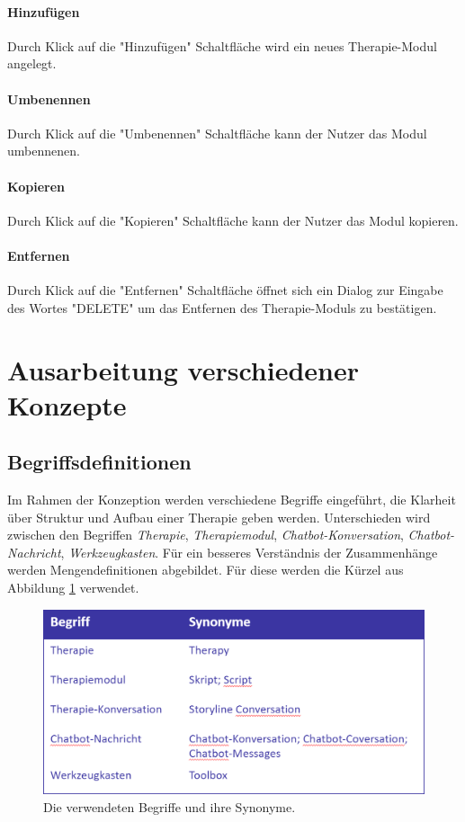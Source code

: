 \paragraph{Hinzufügen}Durch Klick auf die "Hinzufügen" Schaltfläche wird ein neues Therapie-Modul angelegt.

\paragraph{Umbenennen} Durch Klick auf die "Umbenennen" Schaltfläche kann der Nutzer das Modul umbennenen.

\paragraph{Kopieren} Durch Klick auf die "Kopieren" Schaltfläche kann der Nutzer das Modul kopieren.

\paragraph{Entfernen} Durch Klick auf die "Entfernen" Schaltfläche öffnet sich ein Dialog zur Eingabe des Wortes "DELETE" um das Entfernen des Therapie-Moduls zu bestätigen.


\section{Ausarbeitung verschiedener Konzepte}

\subsection{Begriffsdefinitionen}
Im Rahmen der Konzeption werden verschiedene Begriffe eingeführt, die Klarheit über Struktur und Aufbau einer Therapie geben werden. Unterschieden wird zwischen den Begriffen \emph{Therapie}, \emph{Therapiemodul}, \emph{Chatbot-Konversation}, \emph{Chatbot-Nachricht}, \emph{Werkzeugkasten}. Für ein besseres Verständnis der Zusammenhänge werden Mengendefinitionen abgebildet. Für diese werden die Kürzel aus Abbildung \ref{begriffe} verwendet.


\begin{figure}[h]
	\centering
	\includegraphics[width=.75\textwidth]{pictures/begriffe}
	\caption{Die verwendeten Begriffe und ihre Synonyme.}
	\label{begriffe}
\end{figure}

